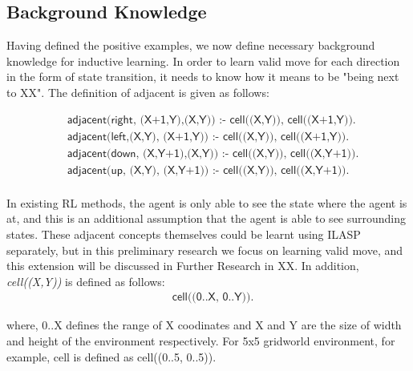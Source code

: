 \label{state_transition_example}

\subsection{Background Knowledge}
Having defined the positive examples, we now define necessary background knowledge for inductive learning.
In order to learn valid move for each direction in the form of state transition, it needs to know how it means to be "being next to XX".
The definition of \textsf{adjacent} is given as follows:

\begin{equation} \label{eq:adjacent}
\begin{split}
&\textsf{adjacent(right, (X+1,Y),(X,Y)) :- cell((X,Y)), cell((X+1,Y)).} \\
&\textsf{adjacent(left,(X,Y),  (X+1,Y)) :- cell((X,Y)), cell((X+1,Y)).} \\
&\textsf{adjacent(down, (X,Y+1),(X,Y)) :- cell((X,Y)), cell((X,Y+1)).} \\
&\textsf{adjacent(up,   (X,Y),  (X,Y+1)) :- cell((X,Y)), cell((X,Y+1)).} \\
\end{split}
\end{equation}

In existing RL methods, the agent is only able to see the state where the agent is at, and this is an additional assumption that the agent is able to see surrounding states.
These adjacent concepts themselves could be learnt using ILASP separately, but in this preliminary research we focus on learning valid move, and this extension will be discussed in Further Research in XX.
In addition, \textit{cell((X,Y))} is defined as follows:
\begin{equation} \label{eq:cell}
\begin{split}
    &\textsf{cell((0..X, 0..Y)).}
\end{split}
\end{equation}

where, 0..X defines the range of X coodinates and X and Y are the size of width and height of the environment respectively. 
For 5x5 gridworld environment, for example, cell is defined as cell((0..5, 0..5)).


